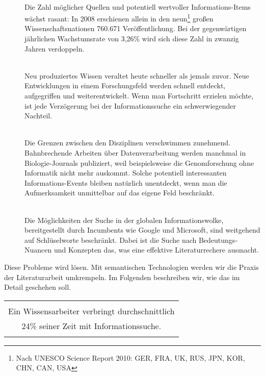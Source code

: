 \begin{description}
  \item[\textbf{\color{orange}{Informationsuniversum wächst:}}] \hfill \\
  Die Zahl möglicher Quellen und potentiell wertvoller Informations-Items wächst rasant: 
In 2008 erschienen allein in den neun\footnote[2]{Nach UNESCO Science Report 2010: GER, FRA, UK, RUS, JPN, KOR, CHN, CAN, USA} großen Wissenschaftsnationen 760.671 Veröffentlichung. Bei der gegenwärtigen jährlichen Wachstumsrate von 3,26\% wird sich diese Zahl in zwanzig Jahren verdoppeln. 
  \item[\textbf{\color{orange}{Information veraltet:}}] \hfill \\
  Neu produziertes Wissen veraltet heute schneller als jemals zuvor. Neue Entwicklungen in einem Forschungsfeld werden schnell entdeckt, aufgegriffen und weiterentwickelt. Wenn man Fortschritt erzielen möchte, ist jede Verzögerung bei der Informationssuche ein schwerwiegender Nachteil. 
  \item[\textbf{\color{orange}{Wissensgebiete werden vernetzt:}}] \hfill \\
  Die Grenzen zwischen den Disziplinen verschwimmen zunehmend. Bahnbrechende Arbeiten über Datenverarbeitung werden manchmal in Biologie-Journals publiziert, weil beispielsweise die Genomforschung ohne Informatik nicht mehr auskommt. Solche potentiell interessanten Informations-Events bleiben natürlich unentdeckt, wenn man die Aufmerksamkeit unmittelbar auf das eigene Feld beschränkt. 
 \item[\textbf{\color{orange}{Verfügbare Such-Tools sind unzulänglich:}}] \hfill \\
	Die Möglichkeiten der Suche in der globalen Informationswolke, bereitgestellt durch Incumbents wie Google und Microsoft, sind weitgehend auf Schlüselworte beschränkt. Dabei ist die Suche nach Bedeutungs-Nuancen und Konzepten das, was eine effektive Literaturrechere ausmacht. 
\end{description} Diese Probleme wird \textsc{\color{orange}{SemLit}} lösen. Mit semantischen Technologien werden wir die Praxis der Literaturarbeit umkrempeln. Im Folgenden beschreiben wir, wie das im Detail geschehen soll. 

\begin{table}[h!]
  \centering
  \begin{large}
	\begin{itshape}
  \begin{tabular}{c}\hline
  \\
  {\color{orange}Ein Wissensarbeiter verbringt durchschnittlich }\\
  {\color{orange}24\% seiner Zeit mit Informationssuche.}\\
  \\\hline
  \end{tabular}
	\end{itshape}
  \end{large}
\end{table}


